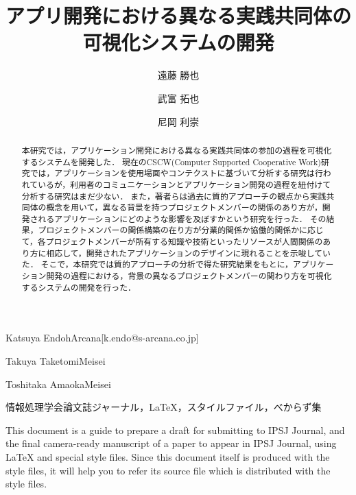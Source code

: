 \documentclass[submit]{ipsj}
\begin{document}
\title{アプリ開発における異なる実践共同体の\\
可視化システムの開発}




\author{遠藤 勝也}{Katsuya Endoh}{Arcana}[k.endo@s-arcana.co.jp]
\author{武富 拓也}{Takuya Taketomi}{Meisei}
\author{尼岡 利崇}{Toshitaka Amaoka}{Meisei}

\begin{abstract}
本研究では，アプリケーション開発における異なる実践共同体の参加の過程を可視化するシステムを開発した．
現在のCSCW(Computer Supported Cooperative Work)研究では，アプリケーションを使用場面やコンテクストに基づいて分析する研究は行われているが，利用者のコミュニケーションとアプリケーション開発の過程を紐付けて分析する研究はまだ少ない．
また，著者らは過去に質的アプローチの観点から実践共同体の概念を用いて，異なる背景を持つプロジェクトメンバーの関係のあり方が，開発されるアプリケーションにどのような影響を及ぼすかという研究を行った．
その結果，プロジェクトメンバーの関係構築の在り方が分業的関係か協働的関係かに応じて，各プロジェクトメンバーが所有する知識や技術といったリソースが人間関係のあり方に相応して，開発されたアプリケーションのデザインに現れることを示唆していた．
そこで，本研究では質的アプローチの分析で得た研究結果をもとに，アプリケーション開発の過程における，背景の異なるプロジェクトメンバーの関わり方を可視化するシステムの開発を行った．
\end{abstract}


\begin{jkeyword}
情報処理学会論文誌ジャーナル，\LaTeX，スタイルファイル，べからず集
\end{jkeyword}

\begin{eabstract}
This document is a guide to prepare a draft for submitting to IPSJ
Journal, and the final camera-ready manuscript of a paper to appear in
IPSJ Journal, using {\LaTeX} and special style files.  Since this
document itself is produced with the style files, it will help you to
refer its source file which is distributed with the style files.
\end{eabstract}
\end{document}
